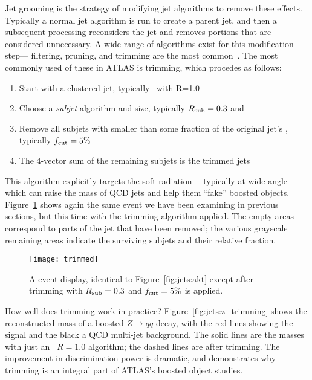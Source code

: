 Jet grooming is the strategy of modifying jet algorithms to remove these effects. Typically a normal jet algorithm is run to create a parent jet, and then a subsequent processing reconsiders the jet and removes portions that are considered unnecessary. A wide range of algorithms exist for this modification step--- filtering, pruning, and trimming are the most common~. The most commonly used of these in ATLAS is trimming, which procedes as follows:
%
\begin{enumerate}
\item Start with a clustered \largeR jet, typically \antikt\ with R=1.0
\item Choose a \textit{subjet} algorithm and size, typically $R_{\rm sub} = 0.3$ and \kt
\item Remove all subjets with \pt smaller than some fraction \fcut of the original jet's \pt, typically $f_{\rm cut}  = 5\%$
\item The 4-vector sum of the remaining subjets is the trimmed jets
\end{enumerate}
%
This algorithm explicitly targets the soft radiation--- typically at wide angle--- which can raise the mass of QCD jets and help them ``fake'' boosted objects. Figure~\ref{fig:jets:trimmed} shows again the same event we have been examining in previous sections, but this time with the trimming algorithm applied. The empty areas correspond to parts of the jet that have been removed; the various grayscale remaining areas indicate the surviving subjets and their relative \pt fraction. 



\begin{figure}
\centering
\texttt{[image: trimmed]}
\label{fig:jets:trimmed}
\caption{A event display, identical to Figure~\ref{fig:jets:akt} except after trimming with $R_{\rm sub} = 0.3$ and $f_{\rm cut} = 5\%$ is applied.}
\end{figure}


How well does trimming work in practice? Figure~\ref{fig:jets:z_trimming} shows the reconstructed mass of a boosted $Z\rightarrow qq$ decay, with the red lines showing the signal and the black a QCD multi-jet background. The solid lines are the masses with just an \antikt\ $R=1.0$ algorithm; the dashed lines are after trimming. The improvement in discrimination power is dramatic, and demonstrates why trimming is an integral part of ATLAS's boosted object studies.


